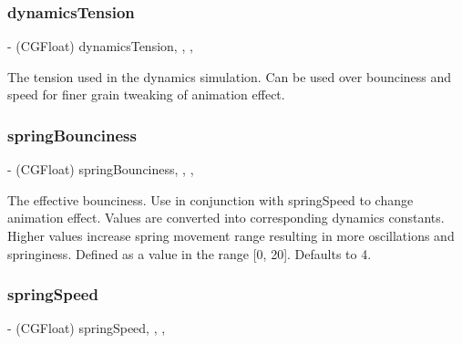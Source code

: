 \subsubsection{\texorpdfstring{dynamics\+Tension}{dynamicsTension}}
{\footnotesize\ttfamily -\/ (C\+G\+Float) dynamics\+Tension\hspace{0.3cm}{\ttfamily [read]}, {\ttfamily [write]}, {\ttfamily [nonatomic]}, {\ttfamily [assign]}}

The tension used in the dynamics simulation.  Can be used over bounciness and speed for finer grain tweaking of animation effect. \mbox{\label{interface_p_o_p_spring_animation_aad2f942dd74dae8972192b09fad6d8fa}} 
\subsubsection{\texorpdfstring{spring\+Bounciness}{springBounciness}}
{\footnotesize\ttfamily -\/ (C\+G\+Float) spring\+Bounciness\hspace{0.3cm}{\ttfamily [read]}, {\ttfamily [write]}, {\ttfamily [nonatomic]}, {\ttfamily [assign]}}

The effective bounciness.  Use in conjunction with \textquotesingle{}spring\+Speed\textquotesingle{} to change animation effect. Values are converted into corresponding dynamics constants. Higher values increase spring movement range resulting in more oscillations and springiness. Defined as a value in the range \mbox{[}0, 20\mbox{]}. Defaults to 4. \mbox{\label{interface_p_o_p_spring_animation_a8a03552461b8d51fe95fec396643a882}} 
\subsubsection{\texorpdfstring{spring\+Speed}{springSpeed}}
{\footnotesize\ttfamily -\/ (C\+G\+Float) spring\+Speed\hspace{0.3cm}{\ttfamily [read]}, {\ttfamily [write]}, {\ttfamily [nonatomic]}, {\ttfamily [assign]}}

